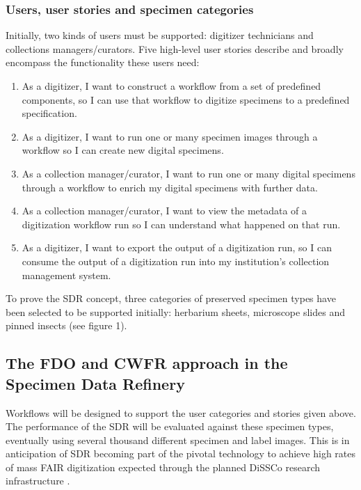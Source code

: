 \hypertarget{users-user-stories-and-specimen-categories}{%
\subsubsection{Users, user stories and specimen
categories}\label{users-user-stories-and-specimen-categories}}

Initially, two kinds of users must be supported: digitizer technicians
and collections managers/curators. Five high-level user stories describe
and broadly encompass the functionality these users need:

\begin{enumerate}
\def\labelenumi{\arabic{enumi}.}
\item
  As a digitizer, I want to construct a workflow from a set of
  predefined components, so I can use that workflow to digitize
  specimens to a predefined specification.
\item
  As a digitizer, I want to run one or many specimen images through a
  workflow so I can create new digital specimens.
\item
  As a collection manager/curator, I want to run one or many digital
  specimens through a workflow to enrich my digital specimens with
  further data.
\item
  As a collection manager/curator, I want to view the metadata of a
  digitization workflow run so I can understand what happened on that
  run.
\item
  As a digitizer, I want to export the output of a digitization run, so
  I can consume the output of a digitization run into my institution's
  collection management system.
\end{enumerate}

To prove the SDR concept, three categories of preserved specimen types
have been selected to be supported initially: herbarium sheets,
microscope slides and pinned insects (see figure 1).

\hypertarget{the-fdo-and-cwfr-approach-in-the-specimen-data-refinery}{%
\subsection{The FDO and CWFR approach in the Specimen Data
Refinery}\label{the-fdo-and-cwfr-approach-in-the-specimen-data-refinery}}

Workflows will be designed to support the user categories and stories
given above. The performance of the SDR will be evaluated against these
specimen types, eventually using several thousand different specimen and
label images. This is in anticipation of SDR becoming part of the
pivotal technology to achieve high rates of mass FAIR digitization
expected through the planned DiSSCo research infrastructure \cite{ch8-6,ch8-5,ch8-30}.

